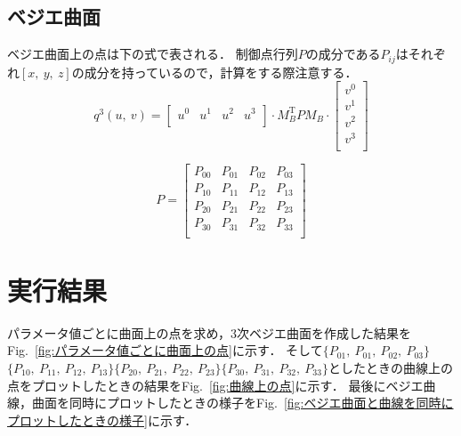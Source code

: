 \documentclass[a4paper,10pt]{jsarticle}
\begin{document}
\subsection{ベジエ曲面}
ベジエ曲面上の点は下の式で表される．
制御点行列$P$の成分である$P_{ij}$はそれぞれ$[x,\ y,\ z]$の成分を持っているので，計算をする際注意する．
\begin{equation}
\label{eq:c}
  q^3(u,\ v) = \left[
    \begin{array}{cccc}
      u^0 & u^1 & u^2 & u^3 \\
    \end{array}
  \right]\cdot M_B^{\mathrm{T}}P M_B \cdot
  \left[
    \begin{array}{c}
      v^0\\
      v^1\\
      v^2\\
      v^3\\
    \end{array}
  \right]
\end{equation}

\begin{equation}
\label{eq:d}
  P =
  \left[
    \begin{array}{cccc}
     P_{00} & P_{01} & P_{02} & P_{03} \\
     P_{10} & P_{11} & P_{12} & P_{13}\\
     P_{20} & P_{21} & P_{22} & P_{23}\\
     P_{30} & P_{31} & P_{32} & P_{33}\\
    \end{array}
  \right]
\end{equation}

\section{実行結果}
パラメータ値ごとに曲面上の点を求め，3次ベジエ曲面を作成した結果をFig.~\ref{fig:パラメータ値ごとに曲面上の点}に示す．
そして$\{P_{01},\ P_{01},\ P_{02},\ P_{03}\}$$\{P_{10},\ P_{11},\ P_{12},\ P_{13}\}$$\{P_{20},\ P_{21},\ P_{22},\ P_{23}\}$$\{P_{30},\ P_{31},\ P_{32},\ P_{33}\}$としたときの曲線上の点をプロットしたときの結果をFig.~\ref{fig:曲線上の点}に示す．
最後にベジエ曲線，曲面を同時にプロットしたときの様子をFig.~\ref{fig:ベジエ曲面と曲線を同時にプロットしたときの様子}に示す．
\end{document}
